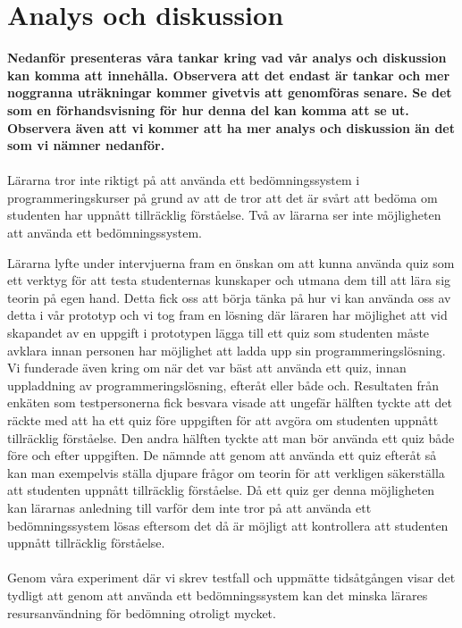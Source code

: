 \documentclass[a4paper,11pt]{article}
\begin{document}
{\newpage
\section{Analys och diskussion}

\textbf{Nedanför presenteras våra tankar kring vad vår analys och diskussion kan komma att innehålla. Observera att det endast är tankar och mer noggranna uträkningar kommer givetvis att genomföras senare. Se det som en förhandsvisning för hur denna del kan komma att se ut. Observera även att vi kommer att ha mer analys och diskussion än det som vi nämner nedanför.}
\\
\\
Lärarna tror inte riktigt på att använda ett bedömningssystem i programmeringskurser på grund av att de tror att det är svårt att bedöma om studenten har uppnått tillräcklig förståelse. Två av lärarna ser inte möjligheten att använda ett bedömningssystem.

Lärarna lyfte under intervjuerna fram en önskan om att kunna använda quiz som ett verktyg för att testa studenternas kunskaper och utmana dem till att lära sig teorin på egen hand. Detta fick oss att börja tänka på hur vi kan använda oss av detta i vår prototyp och vi tog fram en lösning där läraren har möjlighet att vid skapandet av en uppgift i prototypen lägga till ett quiz som studenten måste avklara innan personen har möjlighet att ladda upp sin programmeringslösning. Vi funderade även kring om när det var bäst att använda ett quiz, innan uppladdning av programmeringslösning, efteråt eller både och. Resultaten från enkäten som testpersonerna fick besvara visade att ungefär hälften tyckte att det räckte med att ha ett quiz före uppgiften för att avgöra om studenten uppnått tillräcklig förståelse. Den andra hälften tyckte att man bör använda ett quiz både före och efter uppgiften. De nämnde att genom att använda ett quiz efteråt så kan man exempelvis ställa djupare frågor om teorin för att verkligen säkerställa att studenten uppnått tillräcklig förståelse. Då ett quiz ger denna möjligheten kan lärarnas anledning till varför dem inte tror på att använda ett bedömningssystem lösas eftersom det då är möjligt att kontrollera att studenten uppnått tillräcklig förståelse.
\\
\\
Genom våra experiment där vi skrev testfall och uppmätte tidsåtgången visar det tydligt att genom att använda ett bedömningssystem kan det minska lärares resursanvändning för bedömning otroligt mycket.

}
\end{document}
